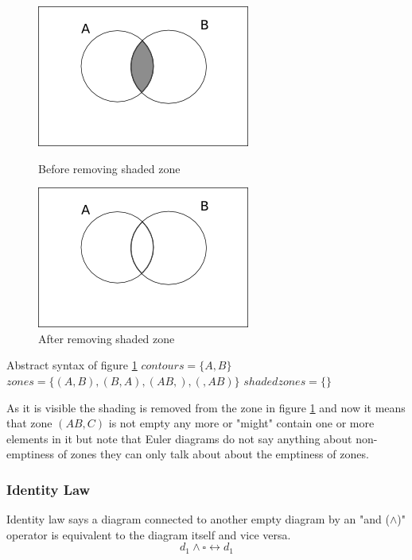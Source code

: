 \documentclass[10pt, a4paper, titlepage]{article}
\begin{document}
\begin{figure}[h]
\begin{minipage}[h]{0.5\linewidth}
\centering
\includegraphics[scale=0.5]{images/diag3add1.png}
\caption{Before removing shaded zone}
\label{fig:d5empty}
\end{minipage}
\hspace{0.5cm}
\begin{minipage}[h]{0.5\linewidth}
\centering
\includegraphics[scale=0.5]{images/d5.png}
\caption{After removing shaded zone}
\label{fig:d5}
\end{minipage}
\end{figure}


Abstract syntax of figure \ref{fig:d5}\newline
$contours =  \lbrace A, B \rbrace $ \newline
$zones = \lbrace (A , B) , (B , A), (AB , ) , ( , AB) \rbrace  $ \newline 
$shaded zones = \lbrace \rbrace  $ \newline

As it is visible the shading is removed from the zone in figure \ref{fig:d5} and now it means that zone $ (AB, C) $ is not empty any more or "might" contain one or more elements in it but note that Euler diagrams do not say anything about non-emptiness of zones they can only talk about about the emptiness of zones.

\subsubsection{Identity Law}
Identity law says a diagram connected to another empty diagram by an "and ($ \wedge $)" operator is equivalent to the diagram itself and vice versa. 
$$ d_{1} \wedge \square \longleftrightarrow d_{1}$$
\end{document}

